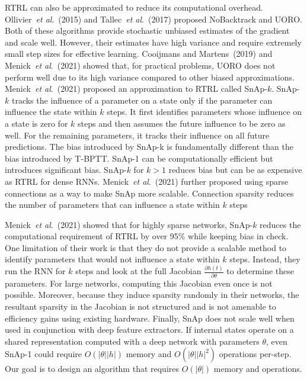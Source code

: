 \documentclass{article}
\newcommand{\etal}{\textit{et al}.}
\begin{document}
RTRL can also be approximated to reduce its computational overhead. Ollivier~\etal~(2015) and Tallec~\etal~(2017) proposed NoBacktrack and UORO. Both of these algorithms provide stochastic unbiased estimates of the gradient and scale well. However, their estimates have high variance and require extremely small step sizes for effective learning. Cooijmans and Martens~(2019) and Menick~\etal~(2021) showed that, for practical problems, UORO does not perform well due to its high variance compared to other biased approximations. Menick~\etal~(2021) proposed an approximation to RTRL called SnAp-$k$. SnAp-$k$ tracks the influence of a parameter on a state only if the parameter can influence the state within $k$ steps. It first identifies parameters whose influence on a state is zero for $k$ steps and then assumes the future influence to be zero as well. For the remaining parameters, it tracks their influence on all future predictions. The bias introduced by SnAp-k is fundamentally different than the bias introduced by T-BPTT. SnAp-1 can be computationally efficient but introduces significant bias. SnAp-$k$ for $k>1$ reduces bias but can be as expensive as RTRL for dense RNNs.  Menick~\etal~(2021) further proposed using sparse connections as a way to make SnAp more scalable. Connection sparsity reduces the number of parameters that can influence a state within $k$ steps

 Menick~\etal~(2021) showed that for highly sparse networks, SnAp-$k$ reduces the computational requirement of RTRL by over 95\% while keeping bias in check. One limitation of their work is that they do not provide a scalable method to identify parameters that would not influence a state within $k$ steps. Instead, they run the RNN for $k$ steps and look at the full Jacobian $\frac{\partial h(t)}{\partial \theta}$ to determine these parameters. For large networks, computing this Jacobian even once is not possible. Moreover, because they induce sparsity randomly in their networks, the resultant sparsity in the Jacobian is not structured and is not amenable to efficiency gains using existing hardware. Finally, SnAp does not scale well when used in conjunction with deep feature extractors. If internal states operate on a shared representation computed with a deep network with parameters $\theta$, even SnAp-1 could require $O(|\theta||h|)$ memory and $O(|\theta||h|^2)$ operations per-step. Our goal is to design an algorithm that requires $O(|\theta|)$ memory and operations.
\end{document}
